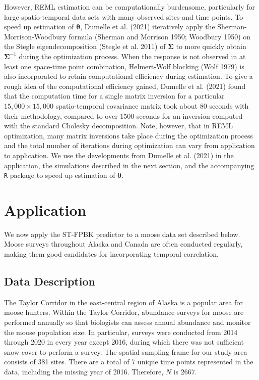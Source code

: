 \documentclass[smallextended]{svjour3}       %
\begin{document}
However, REML estimation can be computationally burdensome, particularly
for large spatio-temporal data sets with many observed sites and time
points. To speed up estimation of \(\bm{\theta}\), Dumelle et al. (2021)
iteratively apply the Sherman-Morrison-Woodbury formula (Sherman and
Morrison 1950; Woodbury 1950) on the Stegle eigendecomposition (Stegle
et al. 2011) of \(\bm{\Sigma}\) to more quickly obtain
\(\bm{\Sigma}^{-1}\) during the optimization process. When the response
is not observed in at least one space-time point combination,
Helmert-Wolf blocking (Wolf 1979) is also incorporated to retain
computational efficiency during estimation. To give a rough idea of the
computational efficiency gained, Dumelle et al. (2021) found that the
computation time for a single matrix inversion for a particular
\(15,000 \times 15,000\) spatio-temporal covariance matrix took about 80
seconds with their methodology, compared to over 1500 seconds for an
inversion computed with the standard Cholesky decomposition. Note,
however, that in REML optimization, many matrix inversions take place
during the optimization process and the total number of iterations
during optimization can vary from application to application. We use the
developments from Dumelle et al. (2021) in the application, the
simulations described in the next section, and the accompanying
\texttt{R} package to speed up estimation of \(\bm{\theta}\).

\hypertarget{section:Application}{%
\section{Application}\label{section:Application}}

We now apply the ST-FPBK predictor to a moose data set described below.
Moose surveys throughout Alaska and Canada are often conducted
regularly, making them good candidates for incorporating temporal
correlation.

\hypertarget{data-description}{%
\subsection{Data Description}\label{data-description}}

The Taylor Corridor in the east-central region of Alaska is a popular
area for moose hunters. Within the Taylor Corridor, abundance surveys
for moose are performed annually so that biologists can assess annual
abundance and monitor the moose population size. In particular, surveys
were conducted from 2014 through 2020 in every year except 2016, during
which there was not sufficient snow cover to perform a survey. The
spatial sampling frame for our study area consists of 381 sites. There
are a total of 7 unique time points represented in the data, including
the missing year of 2016. Therefore, \(N\) is 2667.
\end{document}

